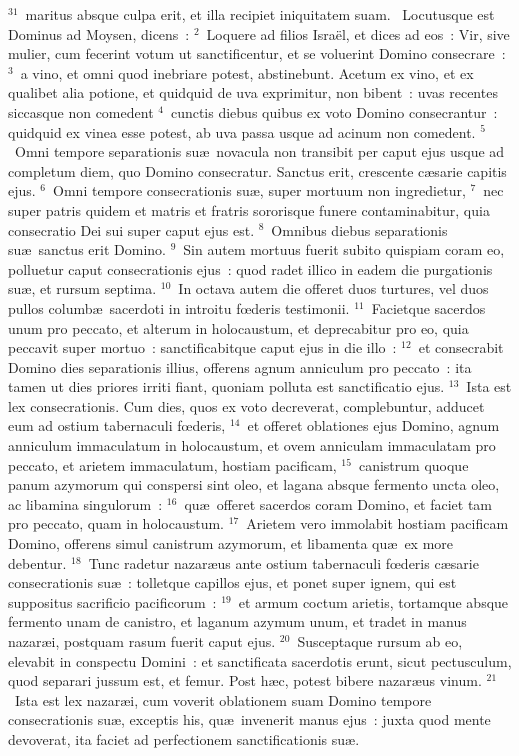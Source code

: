 ${}^{31}$~maritus absque culpa erit, et illa recipiet iniquitatem suam.
~Locutusque est Dominus ad Moysen, dicens~:
${}^{2}$~Loquere ad filios Isra\"el, et dices ad eos~: Vir, sive mulier, cum fecerint votum ut sanctificentur, et se voluerint Domino consecrare~:
${}^{3}$~a vino, et omni quod inebriare potest, abstinebunt. Acetum ex vino, et ex qualibet alia potione, et quidquid de uva exprimitur, non bibent~: uvas recentes siccasque non comedent
${}^{4}$~cunctis diebus quibus ex voto Domino consecrantur~: quidquid ex vinea esse potest, ab uva passa usque ad acinum non comedent.
${}^{5}$~Omni tempore separationis su\ae\ novacula non transibit per caput ejus usque ad completum diem, quo Domino consecratur. Sanctus erit, crescente c\ae sarie capitis ejus.
${}^{6}$~Omni tempore consecrationis su\ae , super mortuum non ingredietur,
${}^{7}$~nec super patris quidem et matris et fratris sororisque funere contaminabitur, quia consecratio Dei sui super caput ejus est.
${}^{8}$~Omnibus diebus separationis su\ae\ sanctus erit Domino.
${}^{9}$~Sin autem mortuus fuerit subito quispiam coram eo, polluetur caput consecrationis ejus~: quod radet illico in eadem die purgationis su\ae , et rursum septima.
${}^{10}$~In octava autem die offeret duos turtures, vel duos pullos columb\ae\ sacerdoti in introitu fœderis testimonii.
${}^{11}$~Facietque sacerdos unum pro peccato, et alterum in holocaustum, et deprecabitur pro eo, quia peccavit super mortuo~: sanctificabitque caput ejus in die illo~:
${}^{12}$~et consecrabit Domino dies separationis illius, offerens agnum anniculum pro peccato~: ita tamen ut dies priores irriti fiant, quoniam polluta est sanctificatio ejus.
${}^{13}$~Ista est lex consecrationis. Cum dies, quos ex voto decreverat, complebuntur, adducet eum ad ostium tabernaculi fœderis,
${}^{14}$~et offeret oblationes ejus Domino, agnum anniculum immaculatum in holocaustum, et ovem anniculam immaculatam pro peccato, et arietem immaculatum, hostiam pacificam,
${}^{15}$~canistrum quoque panum azymorum qui conspersi sint oleo, et lagana absque fermento uncta oleo, ac libamina singulorum~:
${}^{16}$~qu\ae\ offeret sacerdos coram Domino, et faciet tam pro peccato, quam in holocaustum.
${}^{17}$~Arietem vero immolabit hostiam pacificam Domino, offerens simul canistrum azymorum, et libamenta qu\ae\ ex more debentur.
${}^{18}$~Tunc radetur nazar\ae us ante ostium tabernaculi fœderis c\ae sarie consecrationis su\ae~: tolletque capillos ejus, et ponet super ignem, qui est suppositus sacrificio pacificorum~:
${}^{19}$~et armum coctum arietis, tortamque absque fermento unam de canistro, et laganum azymum unum, et tradet in manus nazar\ae i, postquam rasum fuerit caput ejus.
${}^{20}$~Susceptaque rursum ab eo, elevabit in conspectu Domini~: et sanctificata sacerdotis erunt, sicut pectusculum, quod separari jussum est, et femur. Post h\ae c, potest bibere nazar\ae us vinum.
${}^{21}$~Ista est lex nazar\ae i, cum voverit oblationem suam Domino tempore consecrationis su\ae , exceptis his, qu\ae\ invenerit manus ejus~: juxta quod mente devoverat, ita faciet ad perfectionem sanctificationis su\ae .


